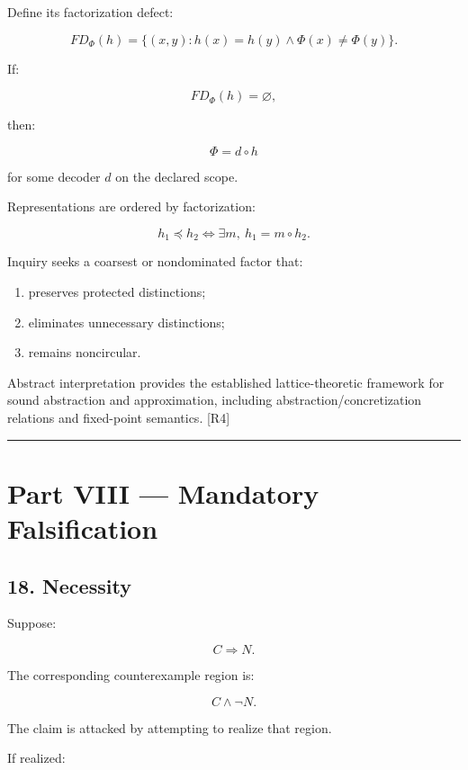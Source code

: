 \documentclass[
]{article}
\providecommand{\tightlist}{%
  \setlength{\itemsep}{0pt}\setlength{\parskip}{0pt}}
\begin{document}
Define its factorization defect:

\[
\boxed{
FD_\Phi(h)
=
\{
(x,y):
h(x)=h(y)
\land
\Phi(x)\neq\Phi(y)
\}.
}
\]

If:

\[
FD_\Phi(h)=\varnothing,
\]

then:

\[
\boxed{
\Phi=d\circ h
}
\]

for some decoder \(d\) on the declared scope.

Representations are ordered by factorization:

\[
\boxed{
h_1\preceq h_2
\iff
\exists m,\ h_1=m\circ h_2.
}
\]

Inquiry seeks a coarsest or nondominated factor that:

\begin{enumerate}
\def\labelenumi{\arabic{enumi}.}
\tightlist
\item
  preserves protected distinctions;
\item
  eliminates unnecessary distinctions;
\item
  remains noncircular.
\end{enumerate}

Abstract interpretation provides the established lattice-theoretic
framework for sound abstraction and approximation, including
abstraction/concretization relations and fixed-point semantics. {[}R4{]}

\begin{center}\rule{0.5\linewidth}{0.5pt}\end{center}

\section{Part VIII --- Mandatory
Falsification}\label{part-viii-mandatory-falsification}

\subsection{18. Necessity}\label{necessity}

Suppose:

\[
C\Rightarrow N.
\]

The corresponding counterexample region is:

\[
\boxed{
C\land\neg N.
}
\]

The claim is attacked by attempting to realize that region.

If realized:
\end{document}
